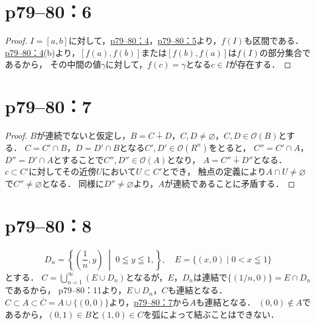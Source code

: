 \section*{p79--80：6}

\begin{leftbar}
    \begin{proof}
        $I = [a,b]$に対して，\hyperref[p79--80：4]{p79--80：4}，\hyperref[p79--80：5]{p79--80：5}より，$f(I)$も区間である．
        \hyperref[p79--80：4]{p79--80：4}(b)より，$[f(a),f(b)]$または$[f(b),f(a)]$は$f(I)$の部分集合であるから，
        その中間の値$\gamma$に対して，$f(c)=\gamma$となる$c \in I$が存在する．
    \end{proof}
\end{leftbar}


\section*{p79--80：7} \label{p79--80：7}

\begin{leftbar}
    \begin{proof}
        $B$が連続でないと仮定し，$B=C\dotplus D$，$C, D \neq \varnothing$，$C,D\in \mathcal{O}(B)$とする．
        $C=C'\cap B$，$D=D'\cap B$となる$C',D'\in \mathcal{O}(R^n)$をとると，
        $C''=C'\cap A$，$D''=D'\cap A$とすることで$C'',D''\in \mathcal{O}(A)$となり，
        $A=C''\dotplus D''$となる．
        $c \subset C'$に対してその近傍$U$において$U\subset C'$とでき，
        触点の定義により$A\cap U\neq \varnothing$で$C''\neq \varnothing$となる．
        同様に$D''\neq \varnothing$より，$A$が連続であることに矛盾する．
    \end{proof}
\end{leftbar}

\section*{p79--80：8}
\begin{leftbar}
    \[
        D_n = \left\{(\frac{1}{n},y)\; \middle| \; 0\leqq y\leqq 1,\right\}, \quad E=\{(x,0)\mid 0<x\leqq 1\}
    \]
    とする．
    $C=\bigcup_{n=1}^{\infty}\left(E\cup D_n\right)$となるが，$E$，$D_n$は連結で$\{ (1/n,0) \}= E \cap D_n$であるから，
    p79--80：11より，$E\cup D_n$，$C$も連結となる．
    $C\subset A\subset \overline{C}=A\cup\{(0,0)\}$より，\hyperref[p79--80：7]{p79--80：7}から$A$も連結となる．
    $(0,0)\notin A$であるから，$(0,1)\in B$と$(1,0)\in C$を弧によって結ぶことはできない．
\end{leftbar}

